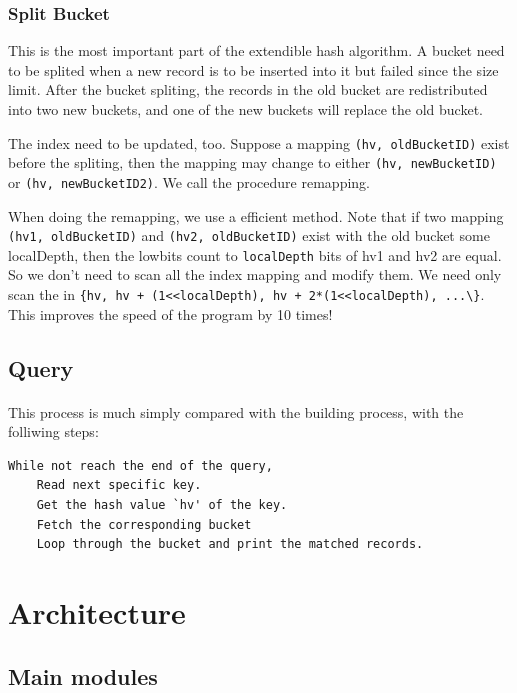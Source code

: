 \documentclass{article}
\begin{document}
    \subsubsection{Split Bucket}
        This is the most important part of the extendible hash algorithm. A bucket need to be splited when a new record is to be inserted into it but failed since the size limit. After the bucket spliting, the records in the old bucket are redistributed into two new buckets, and one of the new buckets will replace the old bucket. 

        The index need to be updated, too. Suppose a mapping \verb|(hv, oldBucketID)| exist before the spliting, then the mapping may change to either \verb|(hv, newBucketID)| or \verb|(hv, newBucketID2)|. We call the procedure remapping.

        When doing the remapping, we use a efficient method. Note that if two mapping \verb|(hv1, oldBucketID)| and \verb|(hv2, oldBucketID)| exist with the old bucket some localDepth, then the lowbits count to \verb|localDepth| bits of hv1 and hv2 are equal. So we don't need to scan all the index mapping and modify them. We need only scan the in \verb|{hv, hv + (1<<localDepth), hv + 2*(1<<localDepth), ...\}|. This improves the speed of the program by 10 times!
    \subsection{Query}
        \paragraph{}
            This process is much simply compared with the building process, with the folliwing steps:
\begin{verbatim}
While not reach the end of the query,
    Read next specific key.
    Get the hash value `hv' of the key.
    Fetch the corresponding bucket
    Loop through the bucket and print the matched records.
\end{verbatim}
\section{Architecture}
    \subsection{Main modules}
\end{document}
